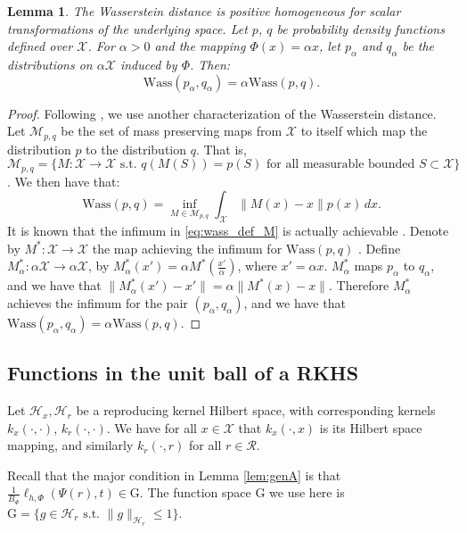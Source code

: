 \documentclass{article}
\newtheorem{thmapplem}{Lemma}
\def\cX{\mathcal X}
\def\cH{\mathcal H}
\def\cF{\mathrm{G}}
\def\cR{\mathcal{R}}
\newcommand{\lythr}{\ell_{h,\Phi}(\Psi(r),t)}
\begin{document}
\begin{thmapplem}\label{lem:wassinvar}
The Wasserstein distance is positive homogeneous for scalar transformations of the underlying space. Let $p$, $q$ be probability density functions defined over $\cX$. For $\alpha>0$ and
 the mapping $\Phi(x) = \alpha x$, let $p_\alpha$ and $q_\alpha$ be the distributions on $\alpha\cX$ induced by $\Phi$. Then:
$$\text{Wass}\left(p_{\alpha  },q_{\alpha  }\right) = \alpha\text{Wass}\left(p,q\right).$$
\end{thmapplem}

\begin{proof}
Following \cite{villani2008optimal,tabak2016preconditioning}, we use another characterization of the Wasserstein  distance. Let $\mathcal{M}_{p,q}$ be the set of mass preserving maps from $\cX$ to itself which map the distribution $p$ to the distribution $q$. That is,  $\mathcal{M}_{p,q} = \{M : \cX \rightarrow \cX \text{ s.t. }q(M(S)) = p(S) \text{ for all measurable bounded } S \subset \cX\}$. We then have that:
\begin{equation}\label{eq:wass_def_M}
\text{Wass}(p,q) = \inf_{M \in \mathcal{M}_{p,q}} \int_\cX \|M(x) - x \| p(x) \, dx .
\end{equation}
It is known that the infimum in \eqref{eq:wass_def_M} is actually achievable \citep[Theorem 5.2]{villani2008optimal}. Denote by $M^*: \cX \rightarrow \cX$ the map achieving the infimum for $\text{Wass}(p,q)$ . Define $M^*_\alpha :\alpha \cX \rightarrow \alpha \cX$, by $M^*_\alpha(x') = \alpha M^*(\frac{x'}{\alpha})$, where $x' = \alpha x$.  $M^*_\alpha$ maps $p_\alpha$ to $q_\alpha$, and we have that $\|M^*_\alpha(x') - x'\| = \alpha \|M^*(x)-x\|$. Therefore $M^*_\alpha$ achieves the infimum for the pair $(p_\alpha,q_\alpha)$, and we have that $\text{Wass}\left(p_{\alpha  },q_{\alpha  }\right) = \alpha\text{Wass}\left(p,q\right)$.
\end{proof}

\subsection{Functions in the unit ball of a RKHS}\label{subsec:mmd}

Let $\cH_x, \cH_r$ be a reproducing kernel Hilbert space, with corresponding kernels $k_x(\cdot,\cdot)$, $k_r(\cdot,\cdot)$. We have for all $x \in \cX$ that  $k_x(\cdot,x)$ is its Hilbert space mapping, and similarly $k_r(\cdot,r)$ for all $r \in \cR$.

Recall that the major condition in Lemma \ref{lem:genA} is that $\frac{1}{B_\Phi} \lythr \in \cF$. The function space $\cF$ we use here is $\cF = \{ g\in \cH_r \text{ s.t. } \|g\|_{\cH_r} \leq 1\}$.
\end{document}
